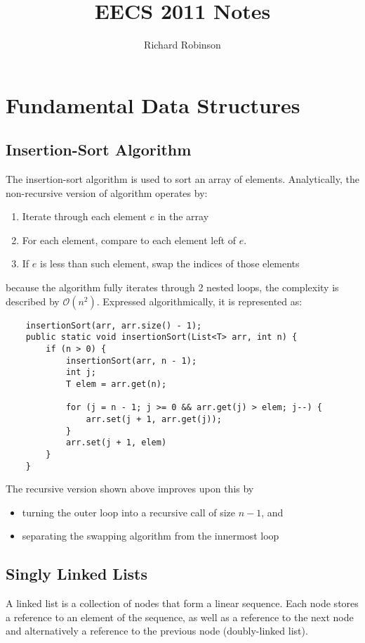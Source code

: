 \documentclass[12pt, letterpaper]{article}
\title{\textbf{EECS 2011 Notes}}
\author{Richard Robinson}
\begin{document}
\maketitle
\tableofcontents
\newpage

\section{Fundamental Data Structures}

\subsection{Insertion-Sort Algorithm }
The insertion-sort algorithm is used to sort an array of elements. Analytically, the non-recursive version of algorithm operates by:
\begin{enumerate}
    \item Iterate through each element $e$ in the array
    \item For each element, compare to each element left of $e$.
    \item If $e$ is less than such element, swap the indices of those elements
\end{enumerate}
because the algorithm fully iterates through 2 nested loops, the complexity is described by $\mathcal O(n^2)$. Expressed algorithmically, it is represented as:
\begin{verbatim}
    insertionSort(arr, arr.size() - 1);
    public static void insertionSort(List<T> arr, int n) {
        if (n > 0) {
            insertionSort(arr, n - 1);
            int j;
            T elem = arr.get(n);

            for (j = n - 1; j >= 0 && arr.get(j) > elem; j--) {
                arr.set(j + 1, arr.get(j));
            }
            arr.set(j + 1, elem)
        }
    }
\end{verbatim}
The recursive version shown above improves upon this by
\begin{itemize}
    \item turning the outer loop into a recursive call of size $n - 1$, and
    \item separating the swapping algorithm from the innermost loop
\end{itemize}

\subsection{Singly Linked Lists }
A linked list is a collection of nodes that form a linear sequence. Each node stores a reference to an element of the sequence, as well as a reference to the next node and alternatively a reference to the previous node (doubly-linked list).
\end{document}
